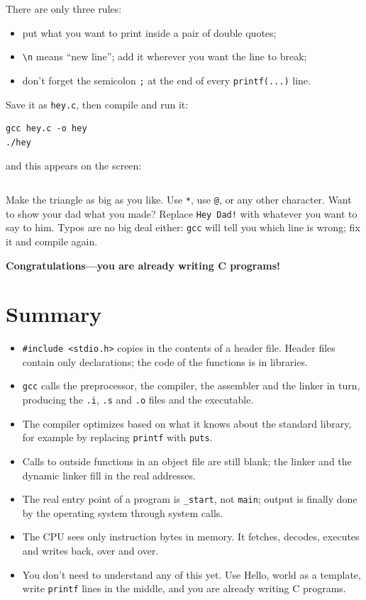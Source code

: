 There are only three rules:
\begin{itemize}
  \item put what you want to print inside a pair of double quotes;
  \item \texttt{\textbackslash n} means ``new line''; add it wherever you want the line to break;
  \item don't forget the semicolon \texttt{;} at the end of every \texttt{printf(...)} line.
\end{itemize}

Save it as \texttt{hey.c}, then compile and run it:
\begin{verbatim}
gcc hey.c -o hey
./hey
\end{verbatim}
and this appears on the screen:
\inputminted[linenos=false]{text}{code/ch01/hey.out}

Make the triangle as big as you like. Use \texttt{*}, use \texttt{@}, or any other character. Want to show your dad what you made? Replace \texttt{Hey Dad!} with whatever you want to say to him. Typos are no big deal either: \texttt{gcc} will tell you which line is wrong; fix it and compile again.

\bigskip
\begin{center}
  {\Large\bfseries Congratulations---you are already writing C programs!}
\end{center}
\bigskip

\section{Summary}

\begin{itemize}
  \item \texttt{\#include <stdio.h>} copies in the contents of a header file. Header files contain only declarations; the code of the functions is in libraries.
  \item \texttt{gcc} calls the preprocessor, the compiler, the assembler and the linker in turn, producing the \texttt{.i}, \texttt{.s} and \texttt{.o} files and the executable.
  \item The compiler optimizes based on what it knows about the standard library, for example by replacing \texttt{printf} with \texttt{puts}.
  \item Calls to outside functions in an object file are still blank; the linker and the dynamic linker fill in the real addresses.
  \item The real entry point of a program is \texttt{\_start}, not \texttt{main}; output is finally done by the operating system through system calls.
  \item The CPU sees only instruction bytes in memory. It fetches, decodes, executes and writes back, over and over.
  \item You don't need to understand any of this yet. Use Hello, world as a template, write \texttt{printf} lines in the middle, and you are already writing C programs.
\end{itemize}

